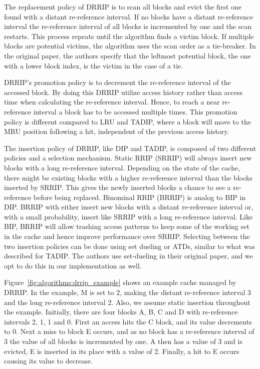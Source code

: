 The replacement policy of DRRIP is to scan all blocks and evict the first one found with a distant re-reference interval.
If no blocks have a distant re-reference interval the re-reference interval of all blocks is incremented by one and the scan restarts.
This process repeats until the algorithm finds a victim block.
If multiple blocks are potential victims, the algorithm uses the scan order as a tie-breaker.
In the original paper, the authors specify that the leftmost potential block, the one with a lower block index, is the victim in the case of a tie.

DRRIP's promotion policy is to decrement the re-reference interval of the accessed block.
By doing this DRRIP utilize access history rather than access time when calculating the re-reference interval.
Hence, to reach a near re-reference interval a block has to be accessed multiple times.
This promotion policy is different compared to LRU and TADIP, where a block will move to the MRU position following a hit, independent of the previous access history.

The insertion policy of DRRIP, like DIP and TADIP, is composed of two different policies and a selection mechanism.
Static RRIP (SRRIP) will always insert new blocks with a long re-reference interval. 
Depending on the state of the cache, there might be existing blocks with a higher re-reference interval than the blocks inserted by SRRIP.
This gives the newly inserted blocks a chance to see a re-reference before being replaced.
Binominal RRIP (BRRIP) is analog to BIP in DIP.
BRRIP with either insert new blocks with a distant re-reference interval or, with a small probability, insert like SRRIP with a long re-reference interval.
Like BIP, BRRIP will allow trashing access patterns to keep some of the working set in the cache and hence improve performance over SRRIP.
Selecting between the two insertion policies can be done using set dueling or ATDs, similar to what was described for TADIP.
The authors use set-dueling in their original paper, and we opt to do this in our implementation as well.

Figure~\ref{fig:algorithms:drrip_example} shows an example cache managed by DRRIP.
In the example, M is set to 2, making the distant re-reference interval 3 and the long re-reference interval 2. 
Also, we assume static insertion throughout the example.
Initially, there are four blocks A, B, C and D with re-reference intervals 2, 1, 1 and 0.
First an access hits the C block, and its value decrements to 0.
Next a miss to block E occurs, and as no block has a re-reference interval of 3 the value of all blocks is incremented by one. 
A then has a value of 3 and is evicted, E is inserted in its place with a value of 2.
Finally, a hit to E occurs causing its value to decrease.